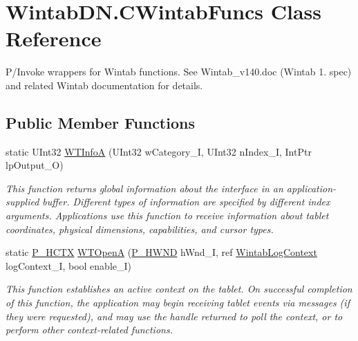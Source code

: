 \hypertarget{class_wintab_d_n_1_1_c_wintab_funcs}{}\section{Wintab\+D\+N.\+C\+Wintab\+Funcs Class Reference}
\label{class_wintab_d_n_1_1_c_wintab_funcs}


P/\+Invoke wrappers for Wintab functions. See Wintab\+\_\+v140.\+doc (Wintab 1. spec) and related Wintab documentation for details.  


\subsection*{Public Member Functions}
\begin{DoxyCompactItemize}
\item 
static U\+Int32 \mbox{\hyperlink{class_wintab_d_n_1_1_c_wintab_funcs_a459af5f8960578fe1194d59b74e99e6a}{W\+T\+InfoA}} (U\+Int32 w\+Category\+\_\+I, U\+Int32 n\+Index\+\_\+I, Int\+Ptr lp\+Output\+\_\+O)
\begin{DoxyCompactList}\small\item\em This function returns global information about the interface in an application-\/supplied buffer. Different types of information are specified by different index arguments. Applications use this function to receive information about tablet coordinates, physical dimensions, capabilities, and cursor types. \end{DoxyCompactList}\item 
static \mbox{\hyperlink{namespace_wintab_d_n_a9ae61204cd14d7ef23008991d1fb6dff}{P\+\_\+\+H\+C\+TX}} \mbox{\hyperlink{class_wintab_d_n_1_1_c_wintab_funcs_a9b247bd729145bbbf929a52aca43e039}{W\+T\+OpenA}} (\mbox{\hyperlink{namespace_wintab_d_n_a33ba63b3dc16db27638a5f294140f53a}{P\+\_\+\+H\+W\+ND}} h\+Wnd\+\_\+I, ref \mbox{\hyperlink{struct_wintab_d_n_1_1_wintab_log_context}{Wintab\+Log\+Context}} log\+Context\+\_\+I, bool enable\+\_\+I)
\begin{DoxyCompactList}\small\item\em This function establishes an active context on the tablet. On successful completion of this function, the application may begin receiving tablet events via messages (if they were requested), and may use the handle returned to poll the context, or to perform other context-\/related functions. \end{DoxyCompactList}\item 

\end{DoxyCompactItemize}
